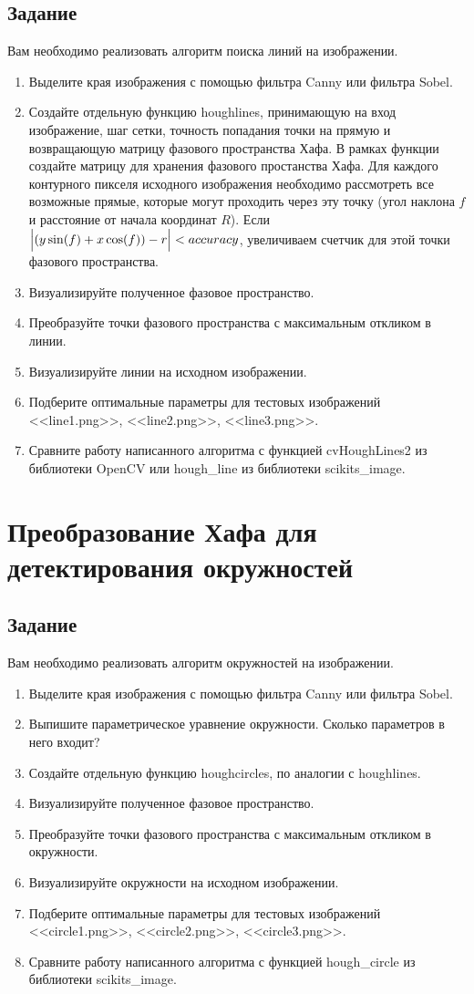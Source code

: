 \documentclass[fleqn]{article}
\begin{document}
\subsection*{Задание}
Вам необходимо реализовать алгоритм поиска линий на изображении.
\begin{enumerate}
    \item Выделите края изображения с помощью фильтра Canny или фильтра Sobel.
    \item Создайте отдельную функцию houghlines, принимающую на вход изображение, шаг сетки, точность попадания точки на прямую и возвращающую матрицу фазового пространства Хафа. В рамках функции создайте матрицу для хранения фазового простанства Хафа. Для каждого контурного пикселя исходного изображения необходимо рассмотреть все возможные прямые, которые могут проходить через эту точку (угол наклона $f$ и расстояние от начала координат $R$). Если $ \Bigl|(y \sin(f) + x \cos(f)) - r \Bigr| < accuracy$, увеличиваем счетчик для этой точки фазового пространства.
    \item Визуализируйте полученное фазовое пространство.
    \item Преобразуйте точки фазового пространства с максимальным откликом в линии.
    \item Визуализируйте линии на исходном изображении.
    \item Подберите оптимальные параметры для тестовых изображений <<line1.png>>, <<line2.png>>, <<line3.png>>.
    \item Сравните работу написанного алгоритма с функцией cvHoughLines2 из
        библиотеки OpenCV или hough\_line из библиотеки scikits\_image.
\end{enumerate}

\section*{Преобразование Хафа для детектирования окружностей}
\subsection*{Задание}
Вам необходимо реализовать алгоритм окружностей на изображении.
\begin{enumerate}
    \item Выделите края изображения с помощью фильтра Canny или фильтра Sobel.
    \item Выпишите параметрическое уравнение окружности. Сколько параметров в него входит?
    \item Создайте отдельную функцию houghcircles, по аналогии с houghlines.
    \item Визуализируйте полученное фазовое пространство.
    \item Преобразуйте точки фазового пространства с максимальным откликом в окружности.
    \item Визуализируйте окружности на исходном изображении.
    \item Подберите оптимальные параметры для тестовых изображений <<circle1.png>>, <<circle2.png>>, <<circle3.png>>.
    \item Сравните работу написанного алгоритма с функцией hough\_circle из
        библиотеки scikits\_image.
\end{enumerate}
\end{document}
